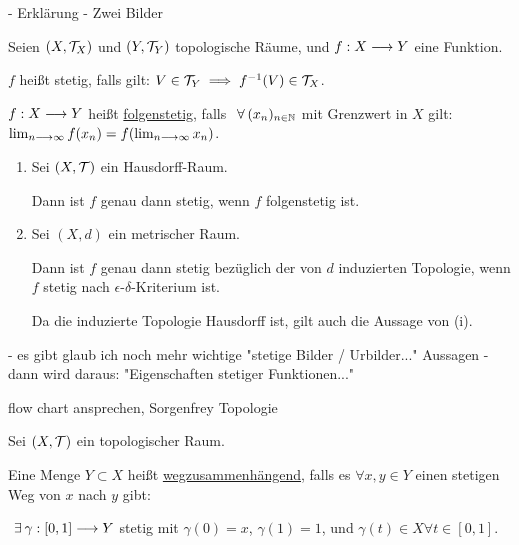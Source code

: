 - Erklärung
- Zwei Bilder

\begin{definition}
    Seien $(X, \mathcal{T}_X)$ und $(Y, \mathcal{T}_Y)$ topologische Räume, und $f: X \longrightarrow Y$ eine Funktion.

    $f$ heißt stetig, falls gilt: $V \in \mathcal{T}_Y \implies f^{-1}(V) \in \mathcal{T}_X$.
\end{definition}

\begin{definition}[Folgenstetigkeit]
    $f: X \longrightarrow Y$ heißt \underline{folgenstetig}, falls $\forall (x_n)_{n \in \N}$ mit Grenzwert in $X$ gilt: $\lim_{n \longrightarrow \infty} f(x_n) = f(\lim_{n \longrightarrow \infty}x_n)$.
\end{definition}

\begin{theorem}
    \begin{enumerate}
        \item Sei $(X, \mathcal{T})$ ein Hausdorff-Raum.

        Dann ist $f$ genau dann stetig, wenn $f$ folgenstetig ist.
        \item Sei $(X, d)$ ein metrischer Raum.

        Dann ist $f$ genau dann stetig bezüglich der von $d$ induzierten Topologie, wenn $f$ stetig nach $\epsilon$-$\delta$-Kriterium ist.

        Da die induzierte Topologie Hausdorff ist, gilt auch die Aussage von (i).
    \end{enumerate}
\end{theorem}

\begin{lemma}
    
\end{lemma}

- es gibt glaub ich noch mehr wichtige "stetige Bilder / Urbilder..." Aussagen
- dann wird daraus: "Eigenschaften stetiger Funktionen..."

\begin{lemma}
    
\end{lemma}

\begin{remark}
    flow chart ansprechen, Sorgenfrey Topologie
\end{remark}

\begin{definition}[wegzusammenhängend]
    Sei $(X, \mathcal{T})$ ein topologischer Raum.

    Eine Menge $Y \subset X$ heißt \underline{wegzusammenhängend}, falls es $\forall x, y \in Y$ einen stetigen Weg von $x$ nach $y$ gibt:

    $\exists \gamma: [0,1] \arr Y$ stetig mit $\gamma(0) = x$, $\gamma(1) = 1$, und $\gamma(t) \in X \forall t \in [0,1]$.
\end{definition}

